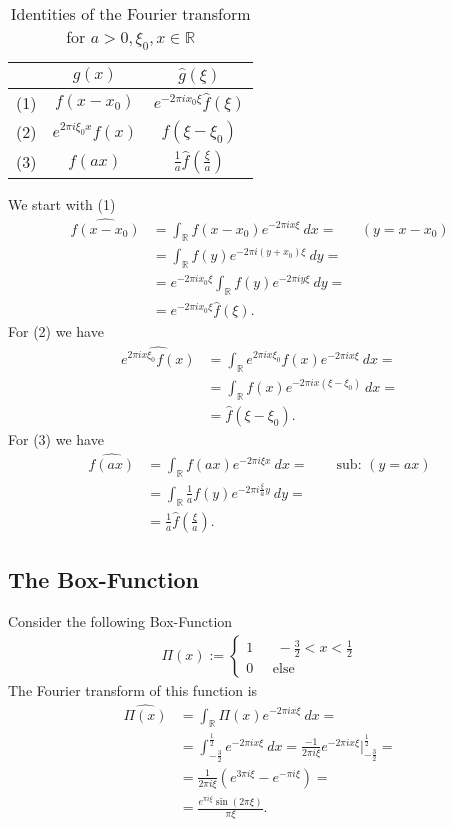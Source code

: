 \begin{table}[h!]
\centering
\begin{tabular}{| l | c | c |}
\hline
  & $g(x)$ & $\hat{g}(\xi)$ \\ \hline \hline
(1) & $f(x-x_0)$ & $e^{-2\pi ix_0 \xi} \hat{f}(\xi)$ \\ \hline
(2) & $e^{2\pi i \xi_0 x} f(x)$ & $f(\xi - \xi_0)$ \\ \hline
(3) & $f(ax)$ & $\frac{1}{a} \hat{f}(\frac{\xi}{a})$\\ \hline
\end{tabular}
    \caption{Identities of the Fourier transform for $a > 0,
    \xi_0, x \in \mathbb{R}$}
\end{table}
We start with (1)
\begin{align}
    \widehat{f(x-x_0)}
    &= \int_\mathbb{R} f(x-x_0) e^{-2\pi i x \xi}\ dx=
    \;\;\;\;\;\; (y = x-x_0)\\
    &= \int_\mathbb{R} f(y) e^{-2\pi i (y+x_0) \xi}\
    dy=\\
    &= e^{-2\pi i x_0 \xi} \int_\mathbb{R}f(y)e^{-2\pi i y
    \xi}\ dy=\\
    &= e^{-2\pi i x_0 \xi} \hat{f}(\xi).
\end{align}
For (2) we have
\begin{align}
    \widehat{e^{2\pi i x \xi_0} f(x)}
    &= \int_\mathbb{R} e^{2\pi i x \xi_0} f(x) e^{-2\pi i x \xi}\ dx =\\
    &= \int_\mathbb{R} f(x) e^{-2\pi i x (\xi -\xi_0)}\ dx=\\
    &= \hat{f}(\xi - \xi_0).
\end{align}
For (3) we have
\begin{align}
    \widehat{f(ax)}
    &= \int_\mathbb{R} f(ax) e^{-2\pi i \xi x}\ dx = \qquad \text{sub:
        $(y=ax)$}\\
    &= \int_\mathbb{R} \frac{1}{a}f(y) e^{-2\pi i \frac{\xi}{a} y}\ dy=\\
    &= \frac{1}{a} \hat{f}\left(\frac{\xi}{a}\right).
\end{align}
\subsection{The Box-Function}
Consider the following Box-Function
\begin{align}
    \Pi(x) :=
    \begin{cases}
        1\;\;\;\;\;\; -\frac{3}{2} < x < \frac{1}{2}\\
        0\;\;\;\;\; \text{else}
    \end{cases}
\end{align}
The Fourier transform of this function is
\begin{align}
    \widehat{\Pi(x)}
    &= \int_\mathbb{R} \Pi(x) e^{-2\pi i x\xi}\ dx=\\
    &= \int_{-\frac{3}{2}}^{\frac{1}{2}} e^{-2\pi i x \xi}\ dx
    =\frac{-1}{2\pi i \xi} e^{-2\pi i x\xi}
    \bigg|_{-\frac{3}{2}}^{\frac{1}{2}}=\\
    &= \frac{1}{2\pi i \xi} \left(e^{3\pi i \xi} - e^{-\pi i \xi}\right)=\\
    &= \frac{e^{\pi i \xi}\sin(2\pi\xi)}{\pi \xi}.
\end{align}


